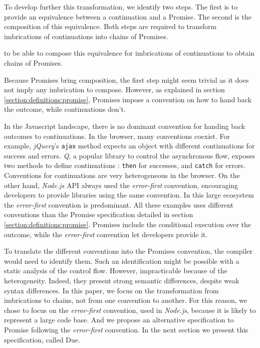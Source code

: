 To develop further this transformation, we identify two steps.
The first is to provide an equivalence between a continuation and a Promise.
The second is the composition of this equivalence.
Both steps are required to transform imbrications of continuations into chains of Promises.

to be able to compose this equivalence for imbrications of continuations to obtain chains of Promises.

Because Promises bring composition, the first step might seem trivial as it does not imply any imbrication to compose.
However, as explained in section \ref{section:definitions:promise}, Promises impose a convention on how to hand back the outcome, while continuations don't.

In the Javascript landscape, there is no dominant convention for handing back outcomes to continuations.
In the browser, many conventions coexist.
For example, \textit{jQuery}'s \texttt{ajax} method expects an object with different continuations for success and errors.
\textit{Q}, a popular library to control the asynchronous flow, exposes two methods to define continuations : \texttt{then} for successes, and \texttt{catch} for errors.
Conventions for continuations are very heterogeneous in the browser.
On the other hand, \textit{Node.js} API always used the \textit{error-first} convention, encouraging developers to provide libraries using the same convention.
In this large ecosystem the \textit{error-first} convention is predominant.
All these examples uses different conventions than the Promise specification detailed in section \ref{section:definitions:promise}.
Promises include the conditional execution over the outcome, while the \textit{error-first} convention let developers provide it.

To translate the different conventions into the Promises convention, the compiler would need to identify them.
Such an identification might be possible with a static analysis of the control flow. 
However, impracticable because of the heterogeneity.
Indeed, they present strong semantic differences, despite weak syntax differences.
In this paper, we focus on the transformation from imbrications to chains, not from one convention to another.
For this reason, we chose to focus on the \textit{error-first} convention, used in \textit{Node.js}, because it is likely to represent a large code base.
And we propose an alternative specification to Promise following the \textit{error-first} convention.
In the next section we present this specification, called Due.

